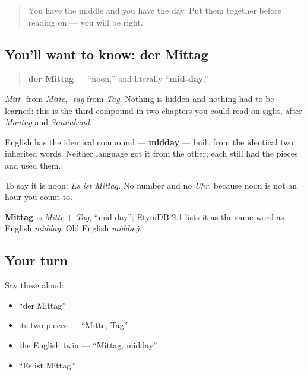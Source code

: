 \label{lesson:GE-C08-mittag}



\begin{quote}
You have the middle and you have the day. Put them together before reading on — you will be right.
\end{quote}

\subsection*{You'll want to know: der Mittag}
\begin{quote}
\textbf{der Mittag} — \textquotedblleft{}noon,\textquotedblright{} and literally \textquotedblleft{}\textbf{mid-day}.\textquotedblright{}
\end{quote}

\emph{Mitt-} from \emph{Mitte}, \emph{-tag} from \emph{Tag}. Nothing is hidden and nothing had to be learned: this is the third compound in two chapters you could read on sight, after \emph{Montag} and \emph{Sonnabend}.

English has the identical compound — \textbf{midday} — built from the identical two inherited words. Neither language got it from the other; each still had the pieces and used them.

To say it is noon: \emph{Es ist Mittag.} No number and no \emph{Uhr}, because noon is not an hour you count to.

\begin{cousinweb}
\textbf{Mittag} is \emph{Mitte} + \emph{Tag}, \textquotedblleft{}mid-day\textquotedblright{}; EtymDB 2.1 lists it as the same word as English \emph{midday}, Old English \emph{middæġ}.
\end{cousinweb}

\subsection*{Your turn}
Say these aloud:

\begin{itemize}
\raggedright
  \item \textquotedblleft{}der Mittag\textquotedblright{}
  \item its two pieces — \textquotedblleft{}Mitte, Tag\textquotedblright{}
  \item the English twin — \textquotedblleft{}Mittag, midday\textquotedblright{}
  \item \textquotedblleft{}Es ist Mittag.\textquotedblright{}
\end{itemize}

